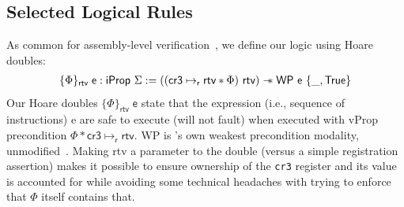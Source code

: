 \subsection{Selected Logical Rules}
\label{sec:selected_rules}
As common for assembly-level verification~, we define our logic using Hoare doubles:%
  \[
  \begin{array}{l}
    \{ \Phi \}_\mathsf{ rtv }\;\textsf{e} : \textsf{iProp }\Sigma := 
   ((\textsf{cr3} \mapsto_{\textsf{r}} \textsf{rtv} \ast \Phi) \textsf{ rtv}) \mathrel{-\!\!\ast} \textsf{WP e } \{\_, \textsf{True} \}
    \end{array}
  \]
Our Hoare doubles $\{\Phi\}_\textsf{rtv}\;\textsf{e}$ state that the expression (i.e., sequence of instructions)
\textsf{e} are safe to execute (will not fault)
when executed with \textsf{vProp} precondition $\Phi\ast\textsf{cr3}\mapsto_{\textsf{r}} \textsf{rtv}$.
\textsf{WP} is \iris's own weakest precondition modality, unmodified~\cite{jung2018iris}.
Making \textsf{rtv} a parameter to the double (versus a simple registration assertion)
makes it possible to ensure ownership of the \lstinline|cr3| register and its value is accounted for
while avoiding some technical headaches with trying to enforce that $\Phi$ itself contains that.

